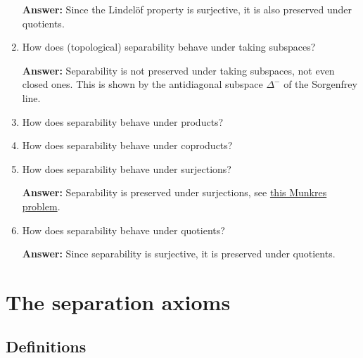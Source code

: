 \begin{enumerate}
    \textbf{Answer:} Since the Lindel\"of property is surjective, it is also preserved under quotients.
    \item How does (topological) separability behave under taking subspaces?
    
    \textbf{Answer:} Separability is not preserved under taking subspaces, not even closed ones. This is shown by the antidiagonal subspace \( \Delta^- \) of the Sorgenfrey line.
    \item How does separability behave under products?
    \item How does separability behave under coproducts?
    \item How does separability behave under surjections?

    \textbf{Answer:} Separability is preserved under surjections, see \hyperlink{MunkresP30.11}{this Munkres problem}.
    \item How does separability behave under quotients?
    
    \textbf{Answer:} Since separability is surjective, it is preserved under quotients.
\end{enumerate}

\section{The separation axioms}

\subsection{Definitions}



